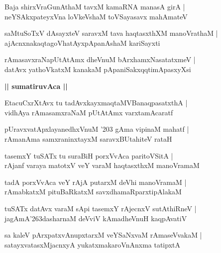 \documentclass[twoside,12pt,openright]{book}
\def\S{\char'263}
\newcounter{shloka}[chapter]
\def\uvaca#1{\centerline{{\large\textbf{#1}}}}
\begin{document}
\begin{shloka}%
Baja shirxVraGunAthaM tavxM kamaRNA manasA girA |\\
neYSAkxpateyxVna loVkeVshaM toVSayasavx mahAmateV 
\end{shloka}

\begin{shloka}%
saMtuSoTxV dAsayxteV saravxM tava haqtasxthXM manoVrathaM |\\
ajAcnxnakaqtagoVhatAyxpApanAshaM kariSayxti 
\end{shloka}

\begin{shloka}%
rAmasavxraNapUtAtAmx dheVnuM bArxhamxNasatatxmeV |\\
datAvx yathoVkatxM kanakaM pApaniSakxqqtimApasxyXsi 
\end{shloka}

\uvaca{|| sumatiruvAca ||}

\begin{shloka}%
EtacuCxrXtAvx tu tadAvxkayxmaqtaMVBanaqpasatxthA |\\
vidhAya rAmasamxraNaM pUtAtAmx varxtamAcaratf 
\end{shloka}

\begin{shloka}%
pUravxvatApxlayanedhxVnuM \char'203 gAma vipinaM mahatf |\\
rAmanAma samxraninxtayxM saravxBUtahiteV rataH 
\end{shloka}

\begin{shloka}%
tasemxY tuSATx tu suraBiH porxVvAca paritoVSitA |\\
rAjanf varaya matotxV veY varaM haqtasxthxM manoVramaM 
\end{shloka}

\begin{shloka}%
tadA porxVvAca veY rAjA putarxM deVhi manoVramaM |\\
rAmabkatxM pituBaRkatxM savxdhamaRparxtipAlakaM 
\end{shloka}

\begin{shloka}%
tuSATx datAvx varaM sApi tasemxY rAjecnxV sutAthiRneV |\\
jagAmA\S dasharnaM deVviV kAmadheVnuH kaqpAvatiV 
\end{shloka}

\begin{shloka}%
sa kaleV pArxpatxvAnupxtarxM veYSaNxvaM rAmaseVvakaM |\\
satayxvatasxMjacnxyA yukatxmakaroVnAnxma tatipxtA 
\end{shloka}
\end{document}
